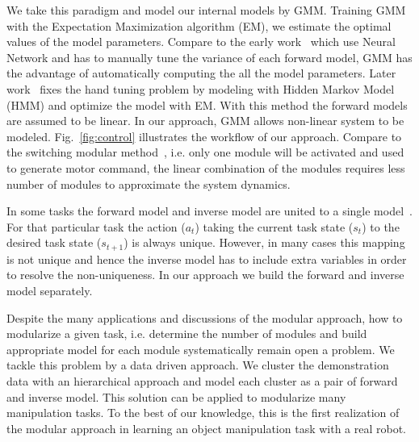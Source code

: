 We take this paradigm and model our internal models by GMM. Training GMM with the Expectation Maximization algorithm (EM), we estimate the optimal values of the model parameters. Compare to the early work~\cite{wolpert1998multiple} which use Neural Network and has to manually tune the variance of each forward model, GMM has the advantage of automatically computing the all the model parameters. Later work~\cite{haruno2001mosaic} fixes the hand tuning problem by modeling with Hidden Markov Model (HMM) and optimize the model with EM. With this method the forward models are assumed to be linear. In our approach, GMM allows non-linear system to be modeled. Fig.~\ref{fig:control} illustrates the workflow of our approach. Compare to the switching modular method~\cite{narendra1997adaptive}, i.e. only one module will be activated and used to generate motor command, the linear combination of the modules requires less number of modules to approximate the system dynamics.


In some tasks the forward model and inverse model are united to a single model~\cite{petkos2006learning}. For that particular task the action ($a_t$) taking the current task state ($s_t$) to the desired task state ($s_{t+1}$) is always unique. However, in many cases this mapping is not unique and hence the inverse model has to include extra variables in order to resolve the non-uniqueness. In our approach we build the forward and inverse model separately.

Despite the many applications and discussions of the modular approach, how to modularize a given task, i.e. determine the number of modules and build appropriate model for each module systematically remain open a problem. We tackle this problem by a data driven approach. We cluster the demonstration data with an hierarchical approach and model each cluster as a pair of forward and inverse model. This solution can be applied to modularize many manipulation tasks. To the best of our knowledge, this is the first realization of the modular approach in learning an object manipulation task with a real robot.

